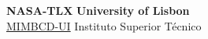 \documentclass{article}
\begin{document}
\noindent
\large\textbf{NASA-TLX} \hfill \textbf{University of Lisbon} \\
\normalsize
\hyperlink{https://mimbcd-ui.github.io/}{MIMBCD-UI} \hfill Instituto Superior T\'{e}cnico \\



\clearpage


\end{document}
